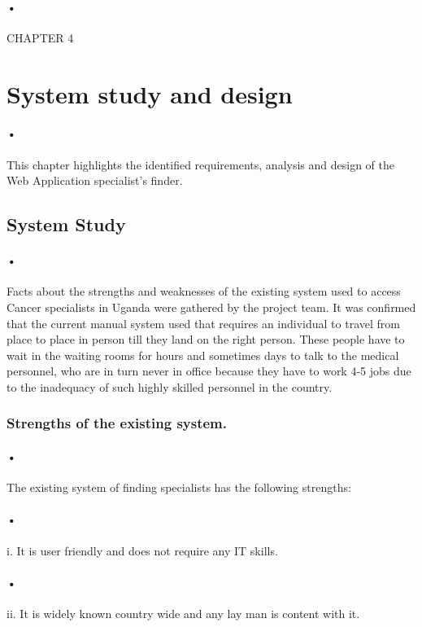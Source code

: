\documentclass[12pt]{article}
\begin{document}
\paragraph{•}CHAPTER 4

\section{System study and design} 
\paragraph{•}This chapter highlights the identified requirements, analysis and design of the Web Application specialist’s finder.

\subsection{System Study}  
\paragraph{•}Facts about the strengths and weaknesses of the existing system used to access Cancer specialists in Uganda were gathered by the project team. It was confirmed that the current manual system used that requires an individual to travel from place to place in person till they land on the right person. These people have to wait in the waiting rooms for hours and sometimes days to talk to the medical personnel, who are in turn never in office because they have to work 4-5 jobs due to the inadequacy of such highly skilled personnel in the country.  

\subsubsection{Strengths of the existing system.}  
\paragraph{•}The existing system of finding specialists has the following strengths:
\paragraph{•}i.	It is user friendly and does not require any IT skills.
\paragraph{•}ii.	It is widely known country wide and any lay man is content with it.
\end{document}
